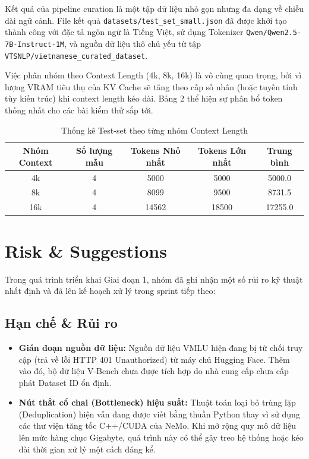﻿\documentclass[12pt,a4paper]{article}
\begin{document}
Kết quả của pipeline curation là một tập dữ liệu nhỏ gọn nhưng đa dạng về chiều dài ngữ cảnh. File kết quả \texttt{datasets/test\_set\_small.json} đã được khởi tạo thành công với đặc tả ngôn ngữ là Tiếng Việt, sử dụng Tokenizer \texttt{Qwen/Qwen2.5-7B-Instruct-1M}, và nguồn dữ liệu thô chủ yếu từ tập \texttt{VTSNLP/vietnamese\_curated\_dataset}.

Việc phân nhóm theo Context Length (4k, 8k, 16k) là vô cùng quan trọng, bởi vì lượng VRAM tiêu thụ của KV Cache sẽ tăng theo cấp số nhân (hoặc tuyến tính tùy kiến trúc) khi context length kéo dài. Bảng 2 thể hiện sự phân bổ token thống nhất cho các bài kiểm thử sắp tới.

\begin{table}[H]
\centering
\begin{tabular}{@{}ccccc@{}}
\toprule
\textbf{Nhóm Context} & \textbf{Số lượng mẫu} & \textbf{Tokens Nhỏ nhất} & \textbf{Tokens Lớn nhất} & \textbf{Trung bình} \\ \midrule
4k & 4 & 5000 & 5000 & 5000.0 \\
8k & 4 & 8099 & 9500 & 8731.5 \\
16k & 4 & 14562 & 18500 & 17255.0 \\ \bottomrule
\end{tabular}
\caption{Thống kê Test-set theo từng nhóm Context Length}
\end{table}

\section{Risk \& Suggestions}

Trong quá trình triển khai Giai đoạn 1, nhóm đã ghi nhận một số rủi ro kỹ thuật nhất định và đã lên kế hoạch xử lý trong sprint tiếp theo:

\subsection{Hạn chế \& Rủi ro}
\begin{itemize}
    \item \textbf{Gián đoạn nguồn dữ liệu:} Nguồn dữ liệu VMLU hiện đang bị từ chối truy cập (trả về lỗi HTTP 401 Unauthorized) từ máy chủ Hugging Face. Thêm vào đó, bộ dữ liệu V-Bench chưa được tích hợp do nhà cung cấp chưa cấp phát Dataset ID ổn định.
    \item \textbf{Nút thắt cổ chai (Bottleneck) hiệu suất:} Thuật toán loại bỏ trùng lặp (Deduplication) hiện vẫn đang được viết bằng thuần Python thay vì sử dụng các thư viện tăng tốc C++/CUDA của NeMo. Khi mở rộng quy mô dữ liệu lên mức hàng chục Gigabyte, quá trình này có thể gây treo hệ thống hoặc kéo dài thời gian xử lý một cách đáng kể.
\end{itemize}
\end{document}
